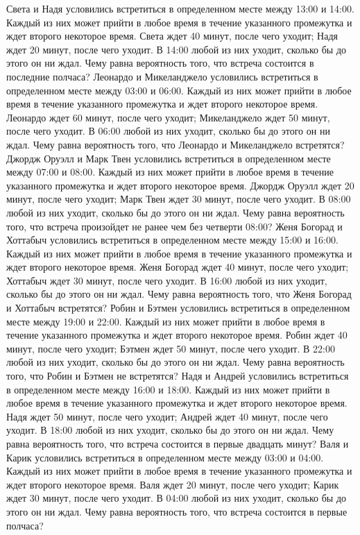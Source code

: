 Света и Надя условились встретиться в определенном месте между 13:00 и 14:00. Каждый из них может прийти в любое время в течение указанного промежутка и ждет второго некоторое время. Света ждет 40 минут, после чего уходит; Надя ждет 20 минут, после чего уходит. В 14:00 любой из них уходит, сколько бы до этого он ни ждал. Чему равна вероятность того, что встреча состоится в последние полчаса?
Леонардо и Микеланджело условились встретиться в определенном месте между 03:00 и 06:00. Каждый из них может прийти в любое время в течение указанного промежутка и ждет второго некоторое время. Леонардо ждет 60 минут, после чего уходит; Микеланджело ждет 50 минут, после чего уходит. В 06:00 любой из них уходит, сколько бы до этого он ни ждал. Чему равна вероятность того, что Леонардо и Микеланджело встретятся?
Джордж Оруэлл и Марк Твен условились встретиться в определенном месте между 07:00 и 08:00. Каждый из них может прийти в любое время в течение указанного промежутка и ждет второго некоторое время. Джордж Оруэлл ждет 20 минут, после чего уходит; Марк Твен ждет 30 минут, после чего уходит. В 08:00 любой из них уходит, сколько бы до этого он ни ждал. Чему равна вероятность того, что встреча произойдет не ранее чем без четверти 08:00?
Женя Богорад и Хоттабыч условились встретиться в определенном месте между 15:00 и 16:00. Каждый из них может прийти в любое время в течение указанного промежутка и ждет второго некоторое время. Женя Богорад ждет 40 минут, после чего уходит; Хоттабыч ждет 30 минут, после чего уходит. В 16:00 любой из них уходит, сколько бы до этого он ни ждал. Чему равна вероятность того, что Женя Богорад и Хоттабыч встретятся?
Робин и Бэтмен условились встретиться в определенном месте между 19:00 и 22:00. Каждый из них может прийти в любое время в течение указанного промежутка и ждет второго некоторое время. Робин ждет 40 минут, после чего уходит; Бэтмен ждет 50 минут, после чего уходит. В 22:00 любой из них уходит, сколько бы до этого он ни ждал. Чему равна вероятность того, что Робин и Бэтмен не встретятся?
Надя и Андрей условились встретиться в определенном месте между 16:00 и 18:00. Каждый из них может прийти в любое время в течение указанного промежутка и ждет второго некоторое время. Надя ждет 50 минут, после чего уходит; Андрей ждет 40 минут, после чего уходит. В 18:00 любой из них уходит, сколько бы до этого он ни ждал. Чему равна вероятность того, что встреча состоится в первые двадцать минут?
Валя и Карик условились встретиться в определенном месте между 03:00 и 04:00. Каждый из них может прийти в любое время в течение указанного промежутка и ждет второго некоторое время. Валя ждет 20 минут, после чего уходит; Карик ждет 30 минут, после чего уходит. В 04:00 любой из них уходит, сколько бы до этого он ни ждал. Чему равна вероятность того, что встреча состоится в первые полчаса?
